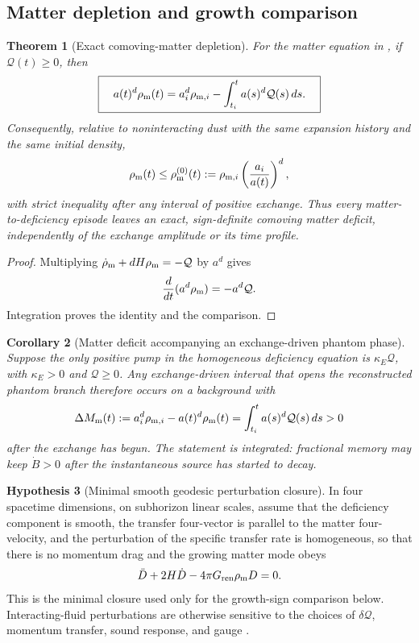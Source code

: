 \documentclass[11pt]{article}
\newtheorem{theorem}{Theorem}[section]
\newtheorem{corollary}[theorem]{Corollary}
\theoremstyle{definition}
\newtheorem{hypothesis}[theorem]{Hypothesis}
\theoremstyle{remark}
\newcommand{\Gren}{G_{\mathrm{ren}}}
\begin{document}
\subsection{Matter depletion and growth comparison}
\label{subsec:matter-depletion-growth}

\begin{theorem}[Exact comoving-matter depletion]
\label{thm:comoving-matter-depletion}
For the matter equation in , if
\(\mathcal Q(t)\ge0\), then
\[
  \boxed{\quad
  a(t)^d\rho_{\rm m}(t)
  =a_i^d\rho_{{\rm m},i}
   -\int_{t_i}^{t}a(s)^d\mathcal Q(s)\,ds.
  \quad}
\]
Consequently, relative to noninteracting dust with the same expansion history
and the same initial density,
\[
  \rho_{\rm m}(t)\le
  \rho_{\rm m}^{(0)}(t)
  :=\rho_{{\rm m},i}\left(\frac{a_i}{a(t)}\right)^d,
\]
with strict inequality after any interval of positive exchange.  Thus every
matter-to-deficiency episode leaves an exact, sign-definite comoving matter
deficit, independently of the exchange amplitude or its time profile.
\end{theorem}

\begin{proof}
Multiplying
\(\dot\rho_{\rm m}+dH\rho_{\rm m}=-\mathcal Q\) by \(a^d\) gives
\[
  \frac{d}{dt}(a^d\rho_{\rm m})=-a^d\mathcal Q.
\]
Integration proves the identity and the comparison.
\end{proof}

\begin{corollary}[Matter deficit accompanying an exchange-driven phantom phase]
\label{cor:phantom-matter-deficit}
Suppose the only positive pump in the homogeneous deficiency equation is
\(\kappa_E\mathcal Q\), with \(\kappa_E>0\) and \(\mathcal Q\ge0\).  Any
exchange-driven interval that opens the reconstructed phantom branch therefore
occurs on a background with
\[
  \Delta M_{\rm m}(t)
  :=a_i^d\rho_{{\rm m},i}-a(t)^d\rho_{\rm m}(t)
  =\int_{t_i}^{t}a(s)^d\mathcal Q(s)\,ds>0
\]
after the exchange has begun.  The statement is integrated: fractional memory
may keep \(\dot B>0\) after the instantaneous source has started to decay.
\end{corollary}

\begin{hypothesis}[Minimal smooth geodesic perturbation closure]
\label{hyp:minimal-growth-closure}
In four spacetime dimensions, on subhorizon linear scales, assume that the
deficiency component is smooth, the transfer four-vector is parallel to the
matter four-velocity, and the perturbation of the specific transfer rate is
homogeneous, so that there is no momentum drag and the growing matter mode
obeys
\[
  \ddot D+2H\dot D-4\pi\Gren\rho_{\rm m}D=0.
\]
This is the minimal closure used only for the growth-sign comparison below.
Interacting-fluid perturbations are otherwise sensitive to the choices of
\(\delta\mathcal Q\), momentum transfer, sound response, and gauge
\cite{ValiviitaMajerottoMaartens,ClemsonEtAl}.
\end{hypothesis}
\end{document}
